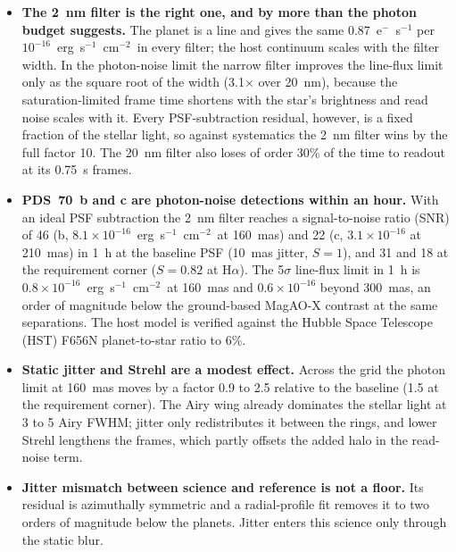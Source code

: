 \documentclass[11pt]{article}
\newcommand{\Ha}{H$\alpha$}
\newcommand{\ergcgs}{erg~s$^{-1}$~cm$^{-2}$}
\begin{document}
\begin{itemize}[leftmargin=*]
  \item \textbf{The 2~nm filter is the right one, and by more than the photon budget suggests.} The planet is a line and gives the same 0.87~e$^-$~s$^{-1}$ per $10^{-16}$~\ergcgs\ in every filter; the host continuum scales with the filter width. In the photon-noise limit the narrow filter improves the line-flux limit only as the square root of the width (3.1$\times$ over 20~nm), because the saturation-limited frame time shortens with the star's brightness and read noise scales with it. Every PSF-subtraction residual, however, is a fixed fraction of the stellar light, so against systematics the 2~nm filter wins by the full factor 10. The 20~nm filter also loses of order 30\% of the time to readout at its 0.75~s frames.
  \item \textbf{PDS~70~b and c are photon-noise detections within an hour.} With an ideal PSF subtraction the 2~nm filter reaches a signal-to-noise ratio (SNR) of 46 (b, $8.1 \times 10^{-16}$~\ergcgs\ at 160~mas) and 22 (c, $3.1 \times 10^{-16}$ at 210~mas) in 1~h at the baseline PSF (10~mas jitter, $S = 1$), and 31 and 18 at the requirement corner ($S = 0.82$ at \Ha). The 5$\sigma$ line-flux limit in 1~h is $0.8 \times 10^{-16}$~\ergcgs\ at 160~mas and $0.6 \times 10^{-16}$ beyond 300~mas, an order of magnitude below the ground-based MagAO-X contrast at the same separations. The host model is verified against the Hubble Space Telescope (HST) F656N planet-to-star ratio to 6\%.
  \item \textbf{Static jitter and Strehl are a modest effect.} Across the grid the photon limit at 160~mas moves by a factor 0.9 to 2.5 relative to the baseline (1.5 at the requirement corner). The Airy wing already dominates the stellar light at 3 to 5 Airy FWHM; jitter only redistributes it between the rings, and lower Strehl lengthens the frames, which partly offsets the added halo in the read-noise term.
  \item \textbf{Jitter mismatch between science and reference is not a floor.} Its residual is azimuthally symmetric and a radial-profile fit removes it to two orders of magnitude below the planets. Jitter enters this science only through the static blur.

\end{itemize}
\end{document}
